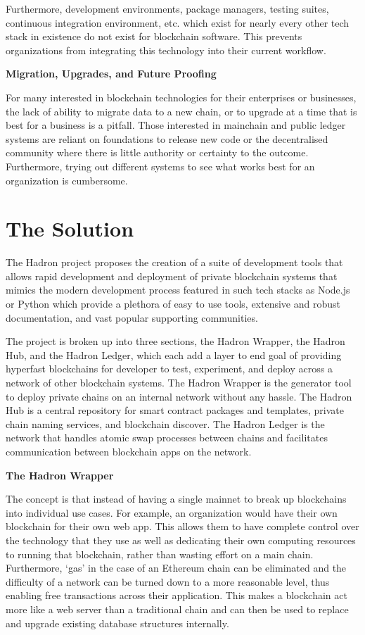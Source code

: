 \documentclass{%
	article}
\begin{document}
Furthermore, development environments, package managers, testing suites, continuous integration environment, etc. which exist for nearly every other tech stack in existence do not exist for blockchain software. This prevents organizations from integrating this technology into their current workflow.

\begin{center}
\textbf{Migration, Upgrades, and Future Proofing}
\end{center}

For many interested in blockchain technologies for their enterprises or businesses, the lack of ability to migrate data to a new chain, or to upgrade at a time that is best for a business is a pitfall. Those interested in mainchain and public ledger systems are reliant on foundations to release new code or the decentralised community where there is little authority or certainty to the outcome. Furthermore, trying out different systems to see what works best for an organization is cumbersome.

\section{The Solution}

The Hadron project proposes the creation of a suite of development tools that allows rapid development and deployment of private blockchain systems that mimics the modern development process featured in such tech stacks as Node.js or Python which provide a plethora of easy to use tools, extensive and robust documentation, and vast popular supporting communities.

The project is broken up into three sections, the Hadron Wrapper, the Hadron Hub, and the Hadron Ledger, which each add a layer to end goal of providing hyperfast blockchains for developer to test, experiment, and deploy across a network of other blockchain systems. The Hadron Wrapper is the generator tool to deploy private chains on an internal network without any hassle. The Hadron Hub is a central repository for smart contract packages and templates, private chain naming services, and blockchain discover. The Hadron Ledger is the network that handles atomic swap processes between chains and facilitates communication between blockchain apps on the network.

\begin{center}
\textbf{The Hadron Wrapper}
\end{center}

The concept is that instead of having a single mainnet to break up blockchains into individual use cases. For example, an organization would have their own blockchain for their own web app. This allows them to have complete control over the technology that they use as well as dedicating their own computing resources to running that blockchain, rather than wasting effort on a main chain. Furthermore, ‘gas’ in the case of an Ethereum chain can be eliminated and the difficulty of a network can be turned down to a more reasonable level, thus enabling free transactions across their application. This makes a blockchain act more like a web server than a traditional chain and can then be used to replace and upgrade existing database structures internally.
\end{document}
